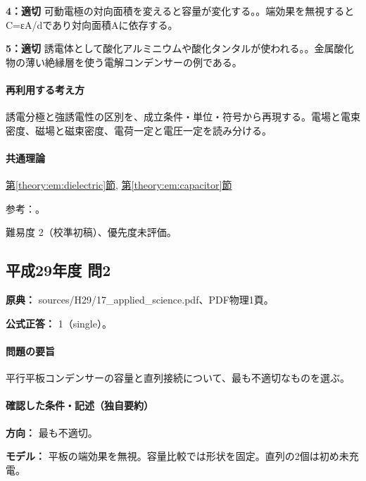 \noindent\textbf{4：適切} 可動電極の対向面積を変えると容量が変化する。。端効果を無視するとC=εA/dであり対向面積Aに依存する。\par

\noindent\textbf{5：適切} 誘電体として酸化アルミニウムや酸化タンタルが使われる。。金属酸化物の薄い絶縁層を使う電解コンデンサーの例である。\par

\paragraph{再利用する考え方} 誘電分極と強誘電性の区別を、成立条件・単位・符号から再現する。電場と電束密度、磁場と磁束密度、電荷一定と電圧一定を読み分ける。

\paragraph{共通理論} \hyperref[theory:em:dielectric]{第\ref*{theory:em:dielectric}節}, \hyperref[theory:em:capacitor]{第\ref*{theory:em:capacitor}節}

\par 参考：\cite{mit_em05,mit_ferroelectric}。

\par 難易度 2（校準初稿）、優先度未評価。

\subsection{平成29年度 問2}
\label{q:h29-reg-applied-02}

\noindent\textbf{原典：} sources/H29/17\_applied\_science.pdf、PDF物理1頁。

\textbf{公式正答：} 1（single）。

\paragraph{問題の要旨} 平行平板コンデンサーの容量と直列接続について、最も不適切なものを選ぶ。

\paragraph{確認した条件・記述（独自要約）}\mbox{}\par

\noindent\textbf{方向：} 最も不適切。\par

\noindent\textbf{モデル：} 平板の端効果を無視。容量比較では形状を固定。直列の2個は初め未充電。\par

